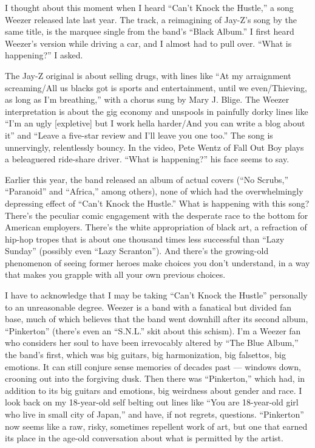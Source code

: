 I thought about this moment when I heard ``Can't Knock the Hustle,'' a
song Weezer released late last year. The track, a reimagining of Jay-Z's
song by the same title, is the marquee single from the band's ``Black
Album.'' I first heard Weezer's version while driving a car, and I
almost had to pull over. ``What is happening?'' I asked.

The Jay-Z original is about selling drugs, with lines like ``At my
arraignment screaming/All us blacks got is sports and entertainment,
until we even/Thieving, as long as I'm breathing,'' with a chorus sung
by Mary J. Blige. The Weezer interpretation is about the gig economy and
unspools in painfully dorky lines like ``I'm an ugly {[}expletive{]} but
I work hella harder/And you can write a blog about it'' and ``Leave a
five-star review and I'll leave you one too.'' The song is unnervingly,
relentlessly bouncy. In the video, Pete Wentz of Fall Out Boy plays a
beleaguered ride-share driver. ``What is happening?'' his face seems to
say.

Earlier this year, the band released an album of actual covers (``No
Scrubs,'' ``Paranoid'' and ``Africa,'' among others), none of which had
the overwhelmingly depressing effect of ``Can't Knock the Hustle.'' What
is happening with this song? There's the peculiar comic engagement with
the desperate race to the bottom for American employers. There's the
white appropriation of black art, a refraction of hip-hop tropes that is
about one thousand times less successful than ``Lazy Sunday'' (possibly
even ``Lazy Scranton''). And there's the growing-old phenomenon of
seeing former heroes make choices you don't understand, in a way that
makes you grapple with all your own previous choices.

I have to acknowledge that I may be taking ``Can't Knock the Hustle''
personally to an unreasonable degree. Weezer is a band with a fanatical
but divided fan base, much of which believes that the band went downhill
after its second album, ``Pinkerton'' (there's even an ``S.N.L.'' skit
about this schism). I'm a Weezer fan who considers her soul to have been
irrevocably altered by ``The Blue Album,'' the band's first, which was
big guitars, big harmonization, big falsettos, big emotions. It can
still conjure sense memories of decades past --- windows down, crooning
out into the forgiving dusk. Then there was ``Pinkerton,'' which had, in
addition to its big guitars and emotions, big weirdness about gender and
race. I look back on my 18-year-old self belting out lines like ``You
are 18-year-old girl who live in small city of Japan,'' and have, if not
regrets, questions. ``Pinkerton'' now seems like a raw, risky, sometimes
repellent work of art, but one that earned its place in the age-old
conversation about what is permitted by the artist.

